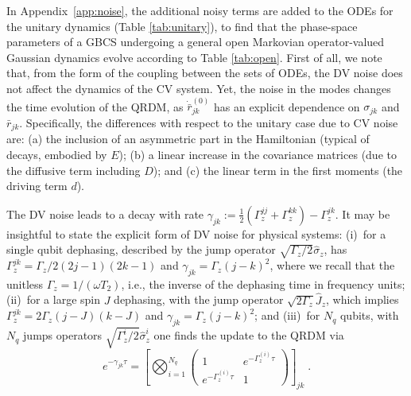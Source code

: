 \documentclass[%
reprint,
superscriptaddress,
nofootinbib,
 amsmath,amssymb,
prx,
floatfix,
]{revtex4-2}
\begin{document}
In Appendix~\ref{app:noise}, the additional noisy terms are added to the ODEs for the unitary dynamics (Table \ref{tab:unitary}), to find that the phase-space parameters of a GBCS undergoing a general open Markovian operator-valued Gaussian dynamics evolve according to Table \ref{tab:open}. First of all, we note that, from the form of the coupling between the sets of ODEs, the DV noise does not affect the dynamics of the CV system. Yet, the noise in the modes changes the time evolution of the QRDM, as $\dot{\bar{r}}_{jk}^{(0)}$ has an explicit dependence on $\sigma_{jk}$ and $\bar{r}_{jk}$. Specifically, the differences with respect to the unitary case due to CV noise are: (a) the inclusion of an asymmetric part in the Hamiltonian (typical of decays, embodied by $E$); (b) a linear increase in the covariance matrices (due to the diffusive term including $D$); and (c) the linear term in the first moments (the driving term $d$). 

The DV noise leads to a decay with rate $\gamma_{jk} := \frac{1}{2} (\Gamma_z^{jj} + \Gamma_z^{kk} ) - \Gamma_z^{jk} $. It may be insightful to state the explicit form of DV noise for physical systems:
(i)~for a single qubit dephasing, described by the jump operator $\sqrt{\Gamma_z/2} \hat{\sigma}_z$, has $\Gamma_z^{jk} = \Gamma_z/2 (2j-1) (2k- 1)$ and $\gamma_{jk}  = \Gamma_z (j - k)^2$, where we recall that the unitless $\Gamma_z  = 1/(\omega T_2)$, i.e., the inverse of the dephasing time in frequency units; (ii)~for a large spin $J$ dephasing, with the jump operator $\sqrt{2 \Gamma_z} \hat{J}_z$, which implies $\Gamma_z^{jk} = 2 \Gamma_z (j-J) (k- J)$ and $\gamma_{jk}  = \Gamma_z (j - k)^2$; and (iii)~for $N_q$ qubits, with $N_q$ jumps operators $\sqrt{\Gamma_{z}^{i}/2} \hat{\sigma}^{i}_z$ one finds the update to the QRDM via 
\begin{equation}
    e^{-\gamma_{jk}\tau}
=
\left[
\bigotimes_{i=1}^{N_q}
\begin{pmatrix}
1 & e^{-\Gamma_z^{(i)}\tau} \\[4pt]
e^{-\Gamma_z^{(i)}\tau} & 1
\end{pmatrix}
\right]_{jk} \; .
\end{equation}
\end{document}
